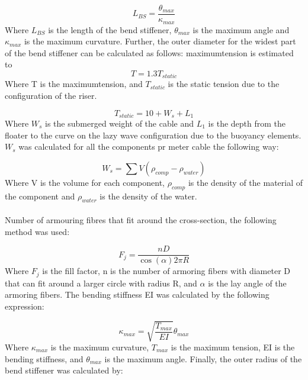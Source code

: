 \begin{equation}
   L_{BS} = \frac{\theta_{max}}{\kappa_{max}} 
  \end{equation}
Where $L_{BS}$ is the length of the bend stiffener, $\theta_{max}$ is the maximum angle and $\kappa_{max}$ is the maximum curvature. \newline
\newline
Further, the outer diameter for the widest part of the bend stiffener can be calculated as follows: \newline
\newline 
maximumtension is estimated to 
\begin{equation}
   T = 1.3  T_{static}
\end{equation}
Where T is the maximumtension, and $T_{static}$ is the static tension due to the configuration of the riser.

\begin{equation}
   T_{static} = 10 + W_s + L_1
\end{equation}
Where $W_s$ is the submerged weight of the cable and $L_1$ is the depth from the floater to the curve on the lazy wave configuration due to the buoyancy elements.\newline
\newline
\noindent $W_s$ was calculated for all the components pr meter cable the following way:

\begin{equation}
   W_s = \sum V (\rho_{comp}-\rho_{water})
\end{equation}
 Where V is the volume for each component, $\rho_{comp}$ is the density of the material of the component and $\rho_{water}$ is the density of the water.\\\\ Number of armouring fibres that fit around the cross-section, the following method was used: 

 \begin{equation}
   F_j=\frac{n D}{\cos{(\alpha)} 2 \pi R}
\end{equation}
Where $F_j$ is the fill factor, n is the number of armoring fibers with diameter D  that can fit around a larger circle with radius R, and $\alpha$ is the lay angle of the armoring fibers.  \newline
\newline 
The bending stiffness EI was calculated by the following expression:

 \begin{equation}
   \kappa_{max} = \sqrt{\frac{T_{max}}{EI}}\theta_{max}
\end{equation}
Where $\kappa_{max}$ is the maximum curvature, $T_{max}$ is the maximum tension, EI is the bending stiffness, and $\theta_{max}$ is the maximum angle.\newline  
\newline 
\noindent Finally, the outer radius of the bend stiffener was calculated by:

